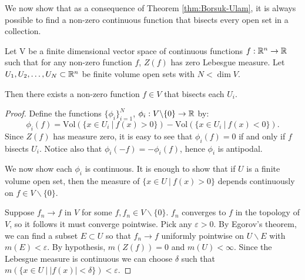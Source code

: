 We now show that as a consequence of Theorem \ref{thm:Borsuk-Ulam}, it is always possible to find a non-zero continuous function that
bisects every open set in a collection. 
\begin{theorem}
Let V be a finite dimensional vector space of continuous functions $f:\mathbb R^n \to \mathbb R$ such that for any non-zero function $f$,
 $Z(f)$ has zero Lebesgue measure. 
Let $U_1,U_2,\dots,U_N \subset \mathbb R^n$ be finite volume open sets with $N< \dim V$. 

Then there exists a non-zero function $f \in V$ that bisects each $U_i$. \label{thm:GenHamSand}
\end{theorem}
\begin{proof}

Define the functions $\{\phi_i\}_{i=1}^N$, $\phi_i: V\backslash \{0\} \to \mathbb R$ by:
\[
\phi_i(f) = \text{Vol}(\{x\in U_i \ | \ f(x) > 0 \}) - \text{Vol}(\{x\in U_i \ |\ f(x) < 0 \}).
\]
Since $Z(f)$ has measure zero, it is easy to see that $\phi_i(f) = 0$ if and only if $f$ bisects $U_i$. 
Notice also that $\phi_i(-f) = -\phi_i(f)$, hence $\phi_i$ is antipodal. 

We now show each $\phi_i$ is continuous.
It is enough to show that if $U$ is a finite volume open set, then the measure of $\{x\in U\ |\ f(x)>0\}$ depends continuously on $f\in V \backslash \{0\}$.

Suppose $f_n \to f$ in $V$ for some $f,f_n \in V \backslash \{0\}$. $f_n$ converges to $f$ in the topology of $V$, 
so it follows it must converge pointwise. Pick any $\varepsilon >0$. 
By Egorov's theorem, we can find a subset $E\subset U$ so that $f_n \to f$ uniformly pointwise on $U \backslash E$ with $m(E)< \varepsilon$.
By hypothesis, $m(Z(f)) =0$ and $m(U) < \infty$. 
Since the Lebesgue measure is continuous we can choose $\delta$ such that $m\left(\{x\in U\ \big |\ |f(x)|<\delta\}\right) < \varepsilon$.


\end{proof}
